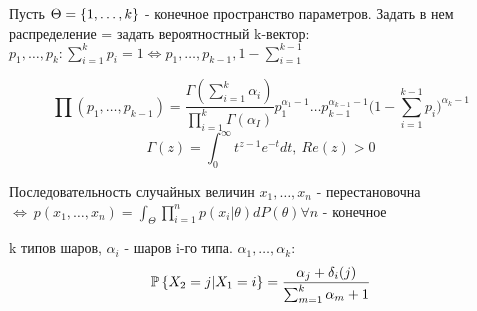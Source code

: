 Пусть $\Theta = \left\{ 1, \ldots, k \right\}$ - конечное пространство параметров. Задать в нем распределение = задать вероятностный k-вектор: $p_1, \ldots, p_k: \sum_{i=1}^k p_i = 1 \Leftrightarrow p_1, \ldots, p_{k-1}, 1-\sum_{i=1}^{k-1}$

\begin{example}
$$ \prod (p_1, \ldots, p_{k-1}) = \frac{\Gamma(\sum_{i=1}^k \alpha_i)}{\prod_{i=1}^k \Gamma(\alpha_I)} p_1^{\alpha_1-1}  \ldots p_{k-1}^{\alpha_{k-1}-1} \Big( 1- \sum_{i=1}^{k-1} p_i\Big)^{\alpha_k -1} $$
$$ \Gamma(z) = \int_0^{\infty} t^{z-1} e^{-t} dt, \ Re(z) > 0 $$
\end{example}

\begin{theorem}[де Финетти]
	Последовательность случайных величин $x_1, \ldots, x_n$ - перестановочна $\Leftrightarrow \ p(x_1, \ldots, x_n) = \int_{\Theta} \prod_{i=1}^n p(x_i|\theta)dP(\theta) \forall n$ - конечное
\end{theorem}

\begin{example}
k типов шаров, $\alpha_i$ - шаров i-го типа.
$\alpha_1, \ldots, \alpha_k:$ $$ \mathbb{P}\left\{ X_2=j|X_1=i \right\} = \frac{\alpha_j + \delta_i(j)}{\sum_{m=1}^k \alpha_m + 1} $$
\end{example}


